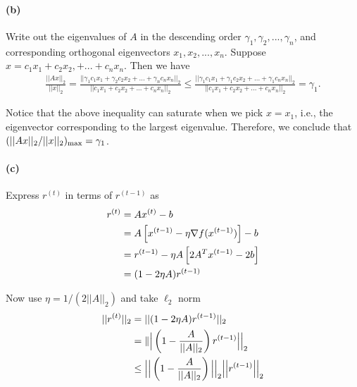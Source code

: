 \documentclass[12pt]{article}
\begin{document}
\paragraph{(b)}
Write out the eigenvalues of $A$ in the descending order $\gamma_1, \gamma_2, ..., \gamma_n$, and corresponding orthogonal eigenvectors $x_1, x_2, ..., x_n$. Suppose $x=c_1x_1 + c_2x_2, + ... + c_nx_n$. Then we have
\begin{align*}
\frac{||Ax||_2}{||x||_2} = \frac{||\gamma_1c_1x_1 + \gamma_2c_2x_2 + ... + \gamma_nc_nx_n||_2}{||c_1x_1 + c_2x_2 + ... + c_nx_n||_2} \leq \frac{||\gamma_1c_1x_1 + \gamma_1c_2x_2 + ... + \gamma_1c_nx_n||_2}{||c_1x_1 + c_2x_2 + ... + c_nx_n||_2} = \gamma_1. 
\end{align*}

Notice that the above inequality can saturate when we pick $x = x_1$, i.e., the eigenvector corresponding to the largest eigenvalue. Therefore, we conclude that $\Large({||Ax||_2}/{||x||_2}\Large)_{\text{max}} = \gamma_1$.

\paragraph{(c)}
Express $r^{(t)}$ in terms of $r^{(t-1)}$ as 
\begin{align*}
r^{(t)} &= A x^{(t)} - b \\
&= A\left[x^{(t-1)} - \eta\nabla f(x^{(t-1)})\right] - b \\
&= r^{(t-1)} - \eta A\left[2A^Tx^{(t-1)}-2b\right]\\
&= \large(1- 2\eta A\large) r^{(t-1)}
\end{align*}

Now use $\eta = 1/(2||A||_2)$ and take $\ell_2$ norm
\begin{align*}
||r^{(t)}||_2 &= ||\large(1- 2\eta A\large) r^{(t-1)}||_2\\
&= \|\Big|\left(1 - \frac{A}{||A||_2}\right)r^{(t-1)}\Big|\Big|_2\\
&\leq \Big|\Big|\left(1 - \frac{A}{||A||_2}\right)\Big|\Big|_2 \Big|\Big| r^{(t-1)}\Big|\Big|_2
\end{align*}
\end{document}
